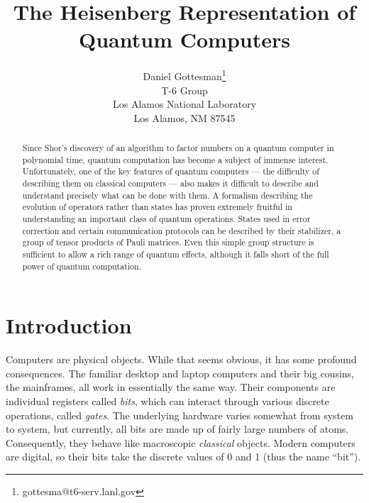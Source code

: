 
\newtheorem{example}{Example}
\newtheorem{theorem}{Theorem}



\title{The Heisenberg Representation of Quantum Computers}
\author{Daniel Gottesman\thanks{gottesma@t6-serv.lanl.gov}\\
T-6 Group\\Los Alamos National Laboratory\\Los Alamos, NM 87545}
\maketitle

\begin{abstract}  
Since Shor's discovery of an algorithm to factor numbers on
a quantum computer in polynomial time, quantum computation
has become a subject of immense interest.  Unfortunately, one
of the key features of quantum computers --- the difficulty
of describing them on classical computers --- also makes it
difficult to describe and understand precisely what can be
done with them.  A formalism describing the evolution of
operators rather than states has proven extremely fruitful
in understanding an important class of quantum operations.
States used in error correction and certain communication
protocols can be described by their stabilizer, a group
of tensor products of Pauli matrices.  Even this simple
group structure is sufficient to allow a rich range of
quantum effects, although it falls short of the full power
of quantum computation.
\end{abstract}

\section{Introduction}

Computers are physical objects.  While that seems obvious, it has some
profound consequences.  The familiar desktop and laptop computers and
their big cousins, the mainframes, all work in essentially the same
way.  Their components are individual registers called {\em bits},
which can interact through various discrete operations, called {\em
gates}.  The underlying hardware varies somewhat from system to
system, but currently, all bits are made up of fairly large numbers of
atoms.  Consequently, they behave like macroscopic {\em classical}
objects.  Modern computers are digital, so their bits take the
discrete values of 0 and 1 (thus the name ``bit'').

